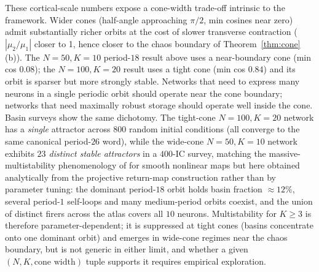 \documentclass[12pt]{article}
\begin{document}
These cortical-scale numbers expose a cone-width trade-off intrinsic to the framework. Wider cones (half-angle approaching $\pi/2$, min cosines near zero) admit substantially richer orbits at the cost of slower transverse contraction ($|\mu_2/\mu_1|$ closer to 1, hence closer to the chaos boundary of Theorem~\ref{thm:cone}(b)). The $N=50, K=10$ period-$18$ result above uses a near-boundary cone (min cos $0.08$); the $N=100, K=20$ result uses a tight cone (min cos $0.84$) and its orbit is sparser but more strongly stable. Networks that need to express many neurons in a single periodic orbit should operate near the cone boundary; networks that need maximally robust storage should operate well inside the cone. Basin surveys show the same dichotomy. The tight-cone $N=100, K=20$ network has a \emph{single} attractor across $800$ random initial conditions (all converge to the same canonical period-$26$ word), while the wide-cone $N=50, K=10$ network exhibits \emph{$23$ distinct stable attractors} in a $400$-IC survey, matching the massive-multistability phenomenology of \citet{feudel1996map} for smooth nonlinear maps but here obtained analytically from the projective return-map construction rather than by parameter tuning: the dominant period-$18$ orbit holds basin fraction $\approx 12\%$, several period-$1$ self-loops and many medium-period orbits coexist, and the union of distinct firers across the atlas covers all $10$ neurons. Multistability for $K\geq 3$ is therefore parameter-dependent; it is suppressed at tight cones (basins concentrate onto one dominant orbit) and emerges in wide-cone regimes near the chaos boundary, but is not generic in either limit, and whether a given $(N, K, \text{cone width})$ tuple supports it requires empirical exploration.
\end{document}
